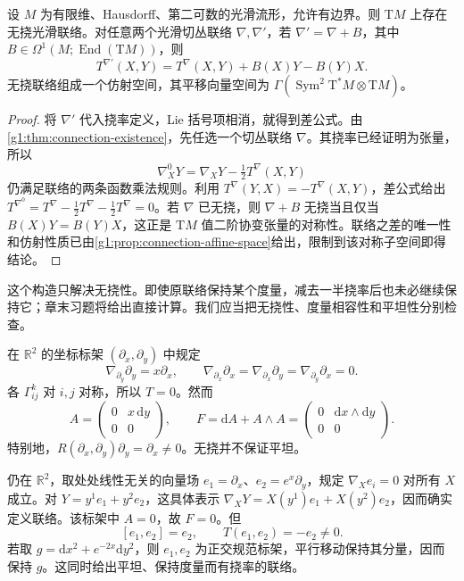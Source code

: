 \begin{proposition}\label{g1:prop:torsion-free-affine-space}
	设 \(M\) 为有限维、Hausdorff、第二可数的光滑流形，允许有边界。则 \(\mathrm{T}M\) 上存在无挠光滑联络。对任意两个光滑切丛联络 \(\nabla,\nabla'\)，若 \(\nabla' =\nabla+B\)，其中 \(B\in\Omega^1(M;\operatorname{End}(\mathrm{T}M))\)，则
	\begin{equation}\label{g1:eq:torsion-difference}
		T^{\nabla'}(X,Y)=T^\nabla(X,Y)+B(X)Y-B(Y)X.
	\end{equation}
	无挠联络组成一个仿射空间，其平移向量空间为 \(\Gamma(\operatorname{Sym}^2\mathrm{T}^*M\otimes \mathrm{T}M)\)。
\end{proposition}
\begin{proof}
	将 \(\nabla'\) 代入挠率定义，Lie 括号项相消，就得到差公式。由\cref{g1:thm:connection-existence}，先任选一个切丛联络 \(\nabla\)。其挠率已经证明为张量，所以
	\[
		\nabla^0_XY=\nabla_XY-\tfrac12T^\nabla(X,Y)
	\]
	仍满足联络的两条函数乘法规则。利用 \(T^\nabla(Y,X)=-T^\nabla(X,Y)\)，差公式给出 \(T^{\nabla^0}=T^\nabla-\tfrac12T^\nabla-\tfrac12T^\nabla=0\)。若 \(\nabla\) 已无挠，则 \(\nabla+B\) 无挠当且仅当 \(B(X)Y=B(Y)X\)，这正是 \(\mathrm{T}M\) 值二阶协变张量的对称性。联络之差的唯一性和仿射性质已由\cref{g1:prop:connection-affine-space}给出，限制到该对称子空间即得结论。
\end{proof}

这个构造只解决无挠性。即使原联络保持某个度量，减去一半挠率后也未必继续保持它；章末习题将给出直接计算。我们应当把无挠性、度量相容性和平坦性分别检查。

\begin{example}\label{g1:exm:torsion-free-curved}
	在 \(\mathbb R^2\) 的坐标标架 \((\partial_x,\partial_y)\) 中规定
	\[
		\nabla_{\partial_y}\partial_y=x\partial_x,
		\qquad\nabla_{\partial_x}\partial_x
		=\nabla_{\partial_x}\partial_y
		=\nabla_{\partial_y}\partial_x=0.
	\]
	各 \(\Gamma^k_{ij}\) 对 \(i,j\) 对称，所以 \(T=0\)。然而
	\[
		A=\begin{pmatrix}0&x\,\mathrm{d}y\\0&0\end{pmatrix},\qquad
		F=\mathrm{d}A+A\wedge A=\begin{pmatrix}0&\mathrm{d}x\wedge\mathrm{d}y\\0&0\end{pmatrix}.
	\]
	特别地，\(R(\partial_x,\partial_y)\partial_y=\partial_x\ne0\)。无挠并不保证平坦。
\end{example}

\begin{example}\label{g1:exm:flat-with-torsion}
	仍在 \(\mathbb R^2\)，取处处线性无关的向量场 \(e_1=\partial_x\)、\(e_2=e^x\partial_y\)，规定 \(\nabla_Xe_i=0\) 对所有 \(X\) 成立。对 \(Y=y^1e_1+y^2e_2\)，这具体表示 \(\nabla_XY=X(y^1)e_1+X(y^2)e_2\)，因而确实定义联络。该标架中 \(A=0\)，故 \(F=0\)。但
	\[
		[e_1,e_2]=e_2,\qquad T(e_1,e_2)=-e_2\ne0.
	\]
	若取 \(g=\mathrm{d}x^2+e^{-2x}\mathrm{d}y^2\)，则 \(e_1,e_2\) 为正交规范标架，平行移动保持其分量，因而保持 \(g\)。这同时给出平坦、保持度量而有挠率的联络。
\end{example}

